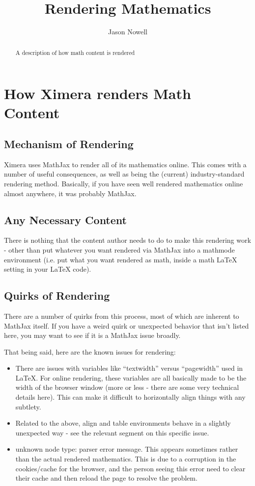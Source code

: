 \documentclass{ximera}
\title{Rendering Mathematics}
\author{Jason Nowell}
\begin{document}
\begin{abstract}
    A description of how math content is rendered
\end{abstract}
\maketitle
   
\section*{How Ximera renders Math Content}
    \subsection*{Mechanism of Rendering}
        Ximera uses MathJax to render all of its mathematics online. This comes with a number of useful consequences, as well as being the (current) industry-standard rendering method. Basically, if you have seen well rendered mathematics online almost anywhere, it was probably MathJax.
    
    
    \subsection*{Any Necessary Content}
        There is nothing that the content author needs to do to make this rendering work - other than put whatever you want rendered via MathJax into a mathmode environment (i.e. put what you want rendered as math, inside a math LaTeX setting in your LaTeX code).
    
    
    \subsection*{Quirks of Rendering}
        There are a number of quirks from this process, most of which are inherent to MathJax itself. If you have a weird quirk or unexpected behavior that isn't listed here, you may want to see if it is a MathJax issue broadly.
        
        That being said, here are the known issues for rendering:
        
        \begin{itemize}
            \item There are issues with variables like ``textwidth'' versus ``pagewidth'' used in LaTeX. For online rendering, these variables are all basically made to be the width of the browser window (more or less - there are some very technical details here). This can make it difficult to horizontally align things with any subtlety.
            \item Related to the above, align and table environments behave in a slightly unexpected way - see the relevant segment on this specific issue.
            \item unknown node type: parser error message. This appears sometimes rather than the actual rendered mathematics. This is due to a corruption in the cookies/cache for the browser, and the person seeing this error need to clear their cache and then reload the page to resolve the problem. 
        \end{itemize}
    
\end{document}
